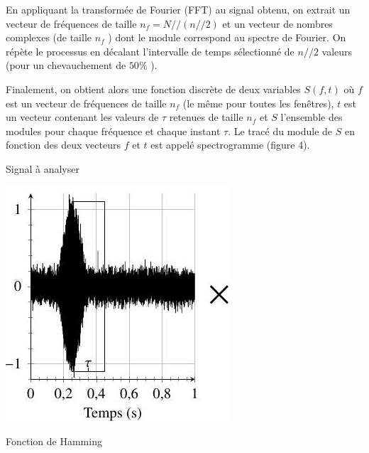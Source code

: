 \documentclass[10pt]{article}
\begin{document}
En appliquant la transformée de Fourier (FFT) au signal obtenu, on extrait un vecteur de fréquences de taille $n_{f}=N / /(n / / 2)$ et un vecteur de nombres complexes (de taille $n_{f}$ ) dont le module correspond au spectre de Fourier. On répète le processus en décalant l'intervalle de temps sélectionné de $n / / 2$ valeurs (pour un chevauchement de $50 \%$ ).

Finalement, on obtient alors une fonction discrète de deux variables $S(f, t)$ où $f$ est un vecteur de fréquences de taille $n_{f}$ (le même pour toutes les fenêtres), $t$ est un vecteur contenant les valeurs de $\tau$ retenues de taille $n_{f}$ et $S$ l'ensemble des modules pour chaque fréquence et chaque instant $\tau$. Le tracé du module de $S$ en fonction des deux vecteurs $f$ et $t$ est appelé spectrogramme (figure 4).

Signal à analyser

\includegraphics[max width=\textwidth]{2022_02_02_1af495ea60fb42b668bfg-04}

Fonction de Hamming
\end{document}
